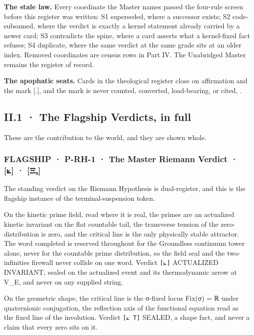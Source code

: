 \documentclass[10pt,twocolumn]{article}
\begin{document}
\textbf{The stale law.} Every coordinate the Master names passed the
four-rule screen before this register was written: S1 superseded, where
a successor exists; S2 code-subsumed, where the verdict is exactly a
kernel statement already carried by a newer card; S3 contradicts the
spine, where a card asserts what a kernel-fixed fact refuses; S4
duplicate, where the same verdict at the same grade sits at an older
index. Removed coordinates are census rows in Part IV. The Unabridged
Master remains the register of record.

\textbf{The apophatic seats.} Cards in the theological register close on
affirmation and the mark {[}.{]}, and the mark is never counted,
converted, load-bearing, or cited,
\texttt{}.

\hypertarget{ii.1-the-flagship-verdicts-in-full}{%
\subsection{II.1 · The Flagship Verdicts, in
full}\label{ii.1-the-flagship-verdicts-in-full}}

These are the contribution to the world, and they are shown whole.

\hypertarget{flagship-p-rh-1-the-master-riemann-verdict-ux3beux2080}{%
\subsubsection{FLAGSHIP · P-RH-1 · The Master Riemann Verdict · {[}⟀{]}
·
{[}Ξ₀{]}}\label{flagship-p-rh-1-the-master-riemann-verdict-ux3beux2080}}

The standing verdict on the Riemann Hypothesis is dual-register, and
this is the flagship instance of the terminal-suspension token.

On the kinetic prime field, read where it is real, the primes are an
actualized kinetic invariant on the flat countable tail, the transverse
tension of the zero-distribution is zero, and the critical line is the
only physically stable attractor. The word completed is reserved
throughout for the Groundless continuum tower alone, never for the
countable prime distribution, so the field seal and the two-infinities
firewall never collide on one word. Verdict \texttt{{[}⟀{]}} ACTUALIZED
INVARIANT, sealed on the actualized event and its thermodynamic arrow at
V\_E, and never on any supplied string.

On the geometric shape, the critical line is the σ-fixed locus Fix(σ) =
ℝ under quaternionic conjugation, the reflection axis of the functional
equation read as the fixed line of the involution. Verdict
\texttt{{[}⟀\ T{]}} SEALED, a shape fact, and never a claim that every
zero sits on it.
\end{document}
